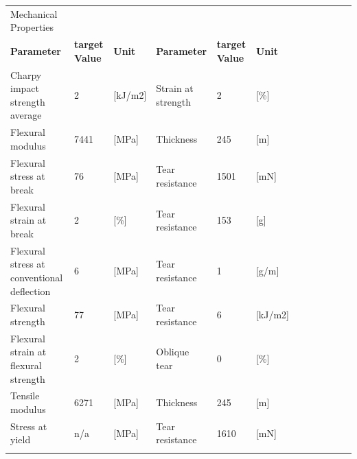 \documentclass{article}
\begin{document}
\begin{center}
	\footnotesize{
		\begin{tabularx}{\textwidth}{ X l X l X l X l X l X l }
			\rowcolor{LightCyan} Mechanical Properties &                       &               &                    &                       &               \\
			\textbf{Parameter}                         & \textbf{target Value} & \textbf{Unit} & \textbf{Parameter} & \textbf{target Value} & \textbf{Unit} \\
			\arrayrulecolor{line_color}\hline
			Charpy impact strength average             & 2                     & [kJ/m2]       & Strain at strength & 2                     & [\%]          \\
			\arrayrulecolor{line_color}\hline
			Flexural modulus                           & 7441                  & [MPa]         & Thickness          & 245                   & [m]           \\
			\arrayrulecolor{line_color}\hline
			Flexural stress at break                   & 76                    & [MPa]         & Tear resistance    & 1501                  & [mN]          \\
			\arrayrulecolor{line_color}\hline
			Flexural strain at break                   & 2                     & [\%]          & Tear resistance    & 153                   & [g]           \\
			\arrayrulecolor{line_color}\hline
			Flexural stress at conventional deflection & 6                     & [MPa]         & Tear resistance    & 1                     & [g/m]         \\
			\arrayrulecolor{line_color}\hline
			Flexural strength                          & 77                    & [MPa]         & Tear resistance    & 6                     & [kJ/m2]       \\
			\arrayrulecolor{line_color}\hline
			Flexural strain at flexural strength       & 2                     & [\%]          & Oblique tear       & 0                     & [\%]          \\
			\arrayrulecolor{line_color}\hline
			Tensile modulus                            & 6271                  & [MPa]         & Thickness          & 245                   & [m]           \\
			\arrayrulecolor{line_color}\hline
			Stress at yield                            & n/a                   & [MPa]         & Tear resistance    & 1610                  & [mN]          \\
			\arrayrulecolor{line_color}\hline

\end{tabularx}}
\end{center}
\end{document}
